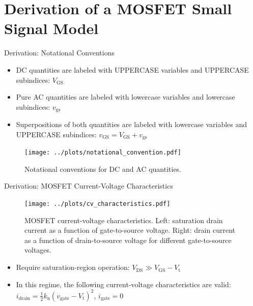 \section{Derivation of a MOSFET Small Signal Model}
\begin{frame}{Derivation: Notational Conventions}
    \begin{itemize}
        \item DC quantities are labeled with UPPERCASE variables and UPPERCASE subindices: 
        $V_{\mathrm{GS}}$
        \item Pure AC quantities are labeled with lowercase variables and lowercase subindices: 
        $v_{\mathrm{gs}}$
        \item Superpositions of both quantities are labeled with lowercase variables and 
        UPPERCASE subindices: $v_{\mathrm{GS}}=V_{\mathrm{GS}}+v_{\mathrm{gs}}$
    \end{itemize}
    \begin{figure}
        \centering
        \texttt{[image: ../plots/notational\_convention.pdf]}
        \caption{Notational conventions for DC and AC quantities.}
        \label{fig:signal_convention}
    \end{figure}
\end{frame}
    

\begin{frame}{Derivation: MOSFET Current-Voltage Characteristics}
    \vspace{0.5cm}
    \begin{figure}
        \centering
        \texttt{[image: ../plots/cv\_characteristics.pdf]}
        \caption{MOSFET current-voltage characteristics. Left: saturation drain current 
        as a function of gate-to-source voltage. Right: drain current as a function of drain-to-source voltage
        for different gate-to-source voltages.}
        \label{fig:mosfet_characteristics}
    \end{figure}
    \begin{itemize}
        \item Require saturation-region operation: $V_{\mathrm{DS}}\gg V_{\mathrm{GS}}-V_{\mathrm{t}}$
        \item In this regime, the following current-voltage characteristics are valid:
        $i_{\mathrm{drain}}=\frac{1}{2}k_{\mathrm{n}}(v_{\mathrm{gate}}-V_{\mathrm{t}})^{2}$, 
        $i_{\mathrm{gate}}=0$
    \end{itemize}
\end{frame}

